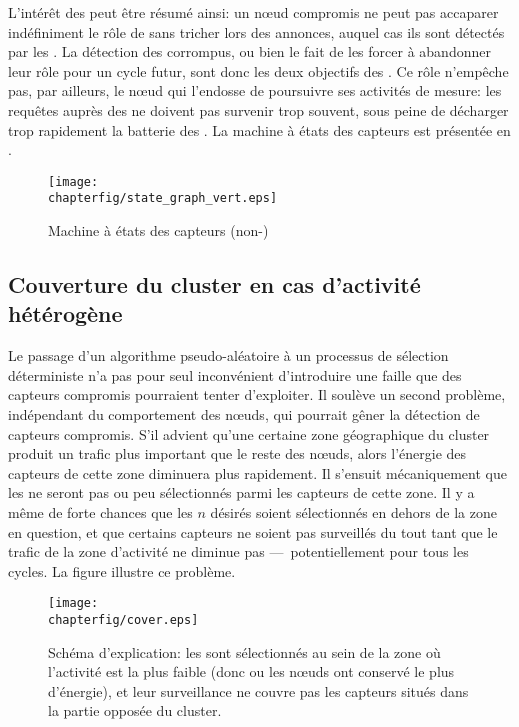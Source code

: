 L'intérêt des \vns peut être résumé ainsi: un nœud compromis ne peut pas accaparer indéfiniment le rôle de \cn sans tricher lors des annonces, auquel cas ils sont détectés par les \vns.
La détection des \cns corrompus, ou bien le fait de les forcer à abandonner leur rôle pour un cycle futur, sont donc les deux objectifs des \vns.
Ce rôle n'empêche pas, par ailleurs, le nœud qui l'endosse de poursuivre ses activités de mesure: les requêtes auprès des \cns ne doivent pas survenir trop souvent, sous peine de décharger trop rapidement la batterie des \vns.
La machine à états des capteurs est présentée en .
\begin{figure}[p]
    \centering
    \texttt{[image: \\chapterfig/state\_graph\_vert.eps]}
    \caption{Machine à états des capteurs (non-\cn)}\label{se:fig:states}
\end{figure}

    \subsection{Couverture du cluster en cas d'activité hétérogène}

Le passage d'un algorithme pseudo-aléatoire à un processus de sélection déterministe n'a pas pour seul inconvénient d'introduire une faille que des capteurs compromis pourraient tenter d'exploiter.
Il soulève un second problème, indépendant du comportement des nœuds, qui pourrait gêner la détection de capteurs compromis.
S'il advient qu'une certaine zone géographique du cluster produit un trafic plus important que le reste des nœuds, alors l'énergie des capteurs de cette zone diminuera plus rapidement.
Il s'ensuit mécaniquement que les \cns ne seront pas ou peu sélectionnés parmi les capteurs de cette zone.
Il y a même de forte chances que les $n$ \cns désirés soient sélectionnés en dehors de la zone en question, et que certains capteurs ne soient pas surveillés du tout tant que le trafic de la zone d'activité ne diminue pas ---~potentiellement pour tous les cycles.
La figure  illustre ce problème.
\begin{figure}[ht]
    \centering
    \texttt{[image: \\chapterfig/cover.eps]}
    \caption{Schéma d'explication: les \cns sont sélectionnés au sein de la zone où l'activité est la plus faible (donc ou les nœuds ont conservé le plus d'énergie), et leur surveillance ne couvre pas les capteurs situés dans la partie opposée du cluster.}\label{se:fig:cover}
\end{figure}

